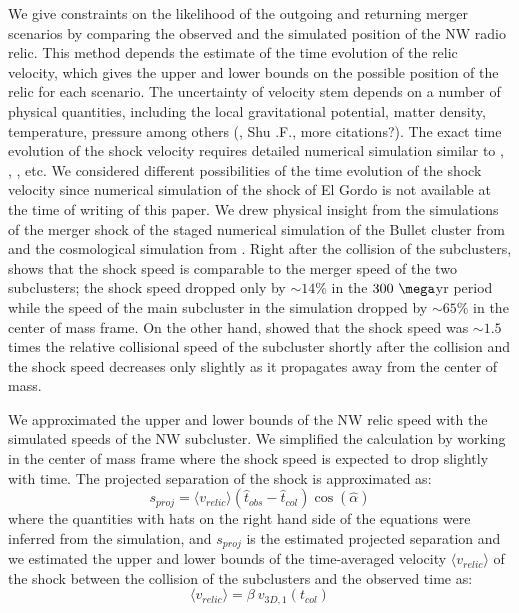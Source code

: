 We give constraints on the likelihood of the
outgoing and returning merger scenarios by comparing the observed and the
simulated position of the NW radio relic.
This method depends the estimate of the
time evolution of the relic velocity, which gives the upper and lower
bounds on the possible position of the relic for each scenario. The
uncertainty of velocity stem depends on a number of physical quantities, including the
local gravitational potential, matter density, temperature, pressure among
others (\citealt{E98}, Shu .F., more citations?).  The exact time evolution
of the shock velocity requires detailed numerical simulation similar to
\citet{Springel2007}, \citet{Vazza11}, \citet{Kang2007}, etc.  
We considered different possibilities of the time evolution of the shock
velocity since numerical simulation of the shock of El Gordo is not
available at the time of writing of this paper. We drew physical insight from the simulations of the merger shock of the
staged numerical simulation of the Bullet cluster from \citet{Springel2007}
and the cosmological simulation from \citet{Paul2011b}. Right after
the collision of the subclusters, \citet{Springel2007} shows that the shock speed is
comparable to the merger speed of the two subclusters; the shock speed
dropped only by $\sim 14\%$ in the $300~\mega$yr period while the speed of
the main subcluster in the simulation dropped by $\sim65\%$ in the center
of mass frame. On the other hand, \citet{Paul2011b} showed that the shock
speed was $\sim1.5$ times the relative collisional speed of the subcluster
shortly after the collision and the shock speed decreases only
slightly as it propagates away from the center of mass. \par  
We approximated the upper and lower bounds of the NW relic speed with the
simulated speeds of the NW subcluster.  We simplified the calculation by
working in the center of mass frame where the shock speed is expected to
drop slightly with time. 
The projected separation of the shock is approximated as:
\begin{equation}
	s_{proj} = \langle v_{relic} \rangle (\hat{t}_{obs} - \hat{t}_{col}) \cos(\hat{\alpha})
\end{equation}
where the quantities with hats on the right hand side of the equations were
inferred from the simulation, and $s_{proj}$ is the estimated projected separation and we estimated the
upper and lower bounds of the time-averaged velocity
$\langle v_{relic} \rangle$ of the shock between
the collision of the subclusters and the observed time as:  
\begin{equation}
	\langle v_{relic} \rangle = \beta~v_{3D,1}(t_{col})  
\end{equation}
